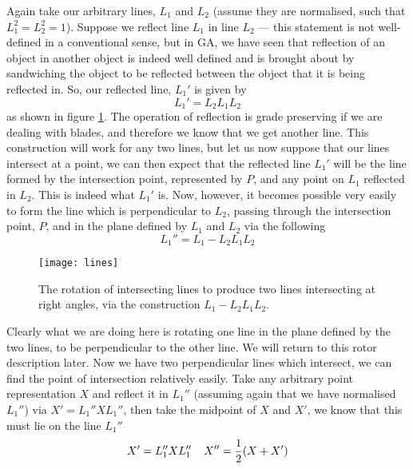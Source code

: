 Again take our arbitrary lines, $L_1$ and $L_2$ (assume
they are normalised, such that $L_1^2=L_2^2=1$). Suppose
we reflect line $L_1$ in line $L_2$ --- this statement is
not well-defined in a conventional sense, but in
GA, we have seen that reflection of an
object in another object is indeed well defined and is
brought about by sandwiching the object to be reflected
between the object that it is being reflected in. So, our
reflected line, $L_1'$ is given by
%
\[  L_1' = L_2L_1L_2  \]
%
as shown in figure \ref{intersect_lines}.
The operation of reflection is grade preserving if we are
dealing with blades, and therefore we know that we get
another line. This construction will work for any two
lines, but let us now suppose that our lines intersect at
a point, we can then expect that the reflected line
$L_1'$ will be the line formed by the intersection point,
represented by $P$, and any point on $L_1$ reflected in $L_2$. This is
indeed what $L_1'$ is. Now, however, it becomes possible
very easily to form the line which is perpendicular to
$L_2$, passing through the intersection point, $P$, and
in the plane defined by $L_1$ and $L_2$ via the following
%
\begin{equation}
 L_1'' =  L_1 - L_2L_1L_2
\end{equation}
%
%
%
\begin{figure}
\centerline{
\texttt{[image: lines]}
} \caption{The rotation of intersecting lines to
produce two lines intersecting at right angles, via the
construction $L_1-L_2L_1L_2$.} \label{intersect_lines}
\end{figure}
Clearly what we are doing here is rotating one line in
the plane defined by the two lines,  to be perpendicular
to the other line. We will return to this rotor
description later.  Now we have two perpendicular lines
which intersect, we can find the point of intersection
relatively easily. Take any arbitrary point representation $X$ and
reflect it in $L_1''$ (assuming again that we have
normalised $L_1''$) via $X' = L_1''XL_1''$, then take the
midpoint of $X$ and $X'$, we know that this must lie on
the line $L_1''$
%
\[ X' = L_1''XL_1'' \;\;\;\; X'' = \frac{1}{2} (X + X')   \]
